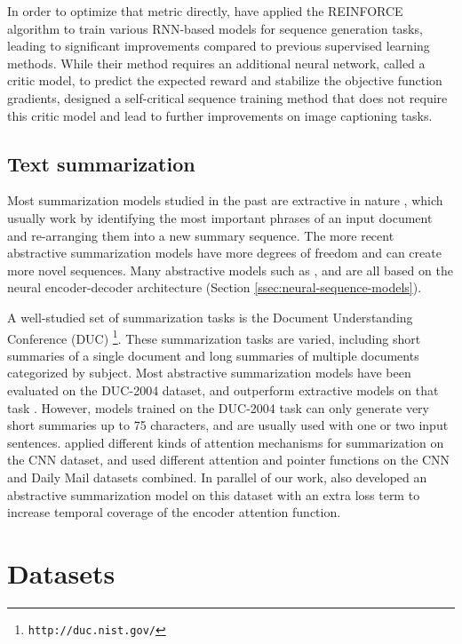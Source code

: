 \documentclass{article} \usepackage{iclr2018_arxiv,times}
\begin{document}
In order to optimize that metric directly, \citet{ranzato2015} have applied the REINFORCE algorithm \citep{williams1992} to train various RNN-based models for sequence generation tasks, leading to significant improvements compared to previous supervised learning methods. While their method requires an additional neural network, called a critic model, to predict the expected reward and stabilize the objective function gradients, \citet{rennie2016} designed a self-critical sequence training method that does not require this critic model and lead to further improvements on image captioning tasks.

\subsection{Text summarization}

Most summarization models studied in the past are extractive in nature \citep{dorr2003,nallapati2017,durrett2016learning}, which usually work by identifying the most important phrases of an input document and re-arranging them into a new summary sequence. The more recent abstractive summarization models have more degrees of freedom and can create more novel sequences. Many abstractive models such as \citet{rush2015}, \citet{chopra2016} and \citet{nallapati2016} are all based on the neural encoder-decoder architecture (Section \ref{ssec:neural-sequence-models}).

A well-studied set of summarization tasks is the Document Understanding Conference (DUC) \footnote{\tt http://duc.nist.gov/}. These summarization tasks are varied, including short summaries of a single document and long summaries of multiple documents categorized by subject. Most abstractive summarization models have been evaluated on the DUC-2004 dataset, and outperform extractive models on that task \citep{dorr2003}. However, models trained on the DUC-2004 task can only generate very short summaries up to 75 characters, and are usually used with one or two input sentences. \citet{chen2016distraction} applied different kinds of attention mechanisms for summarization on the CNN dataset, and \citet{nallapati2016} used different attention and pointer functions on the CNN and Daily Mail datasets combined. In parallel of our work, \citet{see2017} also developed an abstractive summarization model on this dataset with an extra loss term to increase temporal coverage of the encoder attention function.

\section{Datasets}
\label{sec:datasets}
\end{document}
